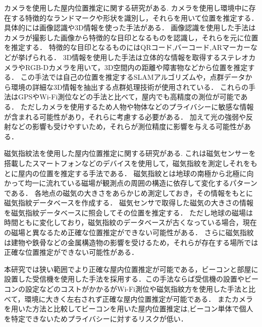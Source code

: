 カメラを使用した屋内位置推定に関する研究がある\cite{camera0}\cite{camera1}.
カメラを使用し環境中に存在する特徴的なランドマークや形状を識別し，それらを用いて位置を推定する．
具体的には画像認識や3D情報を使った手法がある．
画像認識を使用した手法はカメラが撮影した画像から特徴的な目印となるものを認識し，それらを元に位置を推定する．
特徴的な目印となるものにはQRコード,バーコード,ARマーカーなどが挙げられる．
3D情報を使用した手法は立体的な情報を取得するステレオカメラやRGB-Dカメラを用いて，3D空間内の距離や障害物などから位置を推定する．
この手法では自己の位置を推定するSLAMアルゴリズムや，点群データから環境の詳細な3D情報を抽出する点群処理技術が使用されている．
これらの手法はGPSやWi-Fi測位などの手法と比べて，屋内でも高精度の測位が可能である．
ただしカメラを使用するため人物や物体などのプライバシーに敏感な情報が含まれる可能性があり，それらに考慮する必要がある．
加えて光の強弱や反射などの影響も受けやすいため，それらが測位精度に影響を与える可能性がある．



磁気指紋法を使用した屋内位置推定に関する研究がある\cite{magnetic0}\cite{magnetic1}.
これは磁気センサーを搭載したスマートフォンなどのデバイスを使用して，磁気指紋を測定しそれをもとに屋内の位置を推定する手法である．
磁気指紋とは地球の南極から北極に向かって均一に流れている磁場が観測点の周囲の構造に依存して変化するパターンである．
各地点の磁気の大きさをあらかじめ測定しておき，その情報をもとに磁気指紋データベースを作成する．
磁気センサで取得した磁気の大きさの情報を磁気指紋データベースに照会してその位置を推定する．
ただし地球の磁場は時間ともに変化しており，磁気指紋のデータベースが古くなっている場合，現在の磁場と異なるため正確な位置推定ができない可能性がある．
さらに磁気指紋は建物や鉄骨などの金属構造物の影響を受けるため，それらが存在する場所では正確な位置推定ができない可能性がある．


本研究では狭い範囲でより正確な屋内位置推定が可能である，ビーコンと部屋に設置した受信機を使用した手法を採用する．この手法ならば受信機の設置やビーコンの設定などのコストがかかるがWi-Fi測位や磁気指紋方を使用した手法と比べて，環境に大きく左右されず正確な屋内位置推定が可能である．
またカメラを用いた方法と比較してビーコンを用いた屋内位置推定は,ビーコン単体で個人を特定できないためプライバシーに対するリスクが低い．

















